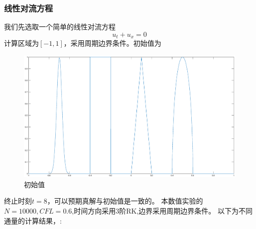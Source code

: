 \documentclass[a4paper,  11pt]{ctexart}
\begin{document}
\subsubsection{线性对流方程}
我们先选取一个简单的线性对流方程
\[ 
    u_t + u_x = 0
\] 
计算区域为$[-1,1]$，采用周期边界条件。初始值为 
\begin{figure}[H]
  \begin{center}
    \includegraphics[width=\textwidth]{./images/advection_t0.eps}
  \end{center}
  \caption{初始值}
\end{figure}
终止时刻$t=8$，可以预期真解与初始值是一致的。
本数值实验的$N=10000,CFL=0.6$,时间方向采用3阶RK,边界采用周期边界条件。
\newpage
以下为不同通量的计算结果，:
\end{document}
